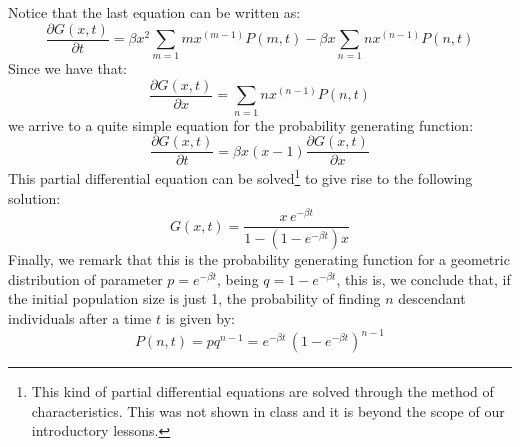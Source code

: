 Notice that the last equation can be written as:
\begin{equation}
\frac{\partial G(x,t)}{\partial t} = \beta x^2 \sum_{m=1} m x^{(m-1)} P(m,t) - \beta x \sum_{n=1}n x^{(n-1)} P(n,t)
\end{equation}
Since we have that:
\begin{equation}
\frac{\partial G(x,t)}{\partial x} = \sum_{n=1} n x^{(n-1)} P(n,t)
\end{equation}
we arrive to a quite simple equation for the probability generating function:
\begin{equation}
\label{eq:GenYule}
\frac{\partial G(x,t)}{\partial t} = \beta x (x-1) \frac{\partial G(x,t)}{\partial x}
\end{equation}
This partial differential equation can be solved\footnote{This kind of partial differential equations are solved through the method of characteristics. This was not shown in class and it is beyond the scope of our introductory lessons.} to give rise to the following solution:
\begin{equation}
G(x,t) = \frac{x \, e^{-\beta t}}{1 - (1 -e^{-\beta t})x}
\end{equation}
Finally, we remark that this is the probability generating function for a geometric distribution of parameter $p=e^{-\beta t}$, being $q=1-e^{-\beta t}$, this is, we conclude that, if the initial population size is just 1, the probability of finding $n$ descendant individuals after a time $t$ is given by:
\begin{equation}
P(n,t) = p q^{n-1} = e^{-\beta t} \, (1 - e^{-\beta t})^{n-1}
\end{equation}

